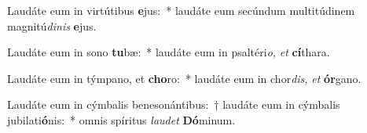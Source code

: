 \item Laudáte eum in virtútibus \textbf{e}jus:~* laudáte eum secúndum multitúdinem magnitú\spurhspace\textit{dinis} \textbf{e}jus.
\item Laudáte eum in sono \textbf{tu}bæ:~* laudáte eum in psaltéri\tinyhspace\textit{o,} \textit{et} \textbf{cí}thara.
\item Laudáte eum in týmpano, et \textbf{cho}ro:~* laudáte eum in chor\textit{dis,} \textit{et} \textbf{ór}gano.
\item Laudáte eum in cýmbalis benesonántibus:~† laudáte eum in cýmbalis jubilati\textbf{ó}nis:~* omnis spíritus \textit{laudet} \textbf{Dó}minum.
